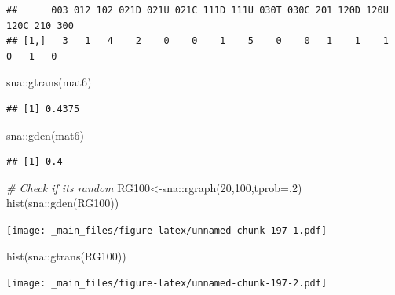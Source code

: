 \documentclass[
  notitlepage,
  onecolumn,
  openany]{book}
\newenvironment{Shaded}{\begin{snugshade}}{\end{snugshade}}
\newcommand{\AttributeTok}[1]{\textcolor[rgb]{0.77,0.63,0.00}{#1}}
\newcommand{\CommentTok}[1]{\textcolor[rgb]{0.56,0.35,0.01}{\textit{#1}}}
\newcommand{\DecValTok}[1]{\textcolor[rgb]{0.00,0.00,0.81}{#1}}
\newcommand{\FunctionTok}[1]{\textcolor[rgb]{0.00,0.00,0.00}{#1}}
\newcommand{\NormalTok}[1]{#1}
\newcommand{\OtherTok}[1]{\textcolor[rgb]{0.56,0.35,0.01}{#1}}
\newcommand{\SpecialCharTok}[1]{\textcolor[rgb]{0.00,0.00,0.00}{#1}}
\begin{document}
\begin{verbatim}
##      003 012 102 021D 021U 021C 111D 111U 030T 030C 201 120D 120U 120C 210 300
## [1,]   3   1   4    2    0    0    1    5    0    0   1    1    1    0   1   0
\end{verbatim}

\begin{Shaded}
\begin{Highlighting}[]
\NormalTok{sna}\SpecialCharTok{::}\FunctionTok{gtrans}\NormalTok{(mat6)}
\end{Highlighting}
\end{Shaded}

\begin{verbatim}
## [1] 0.4375
\end{verbatim}

\begin{Shaded}
\begin{Highlighting}[]
\NormalTok{sna}\SpecialCharTok{::}\FunctionTok{gden}\NormalTok{(mat6)}
\end{Highlighting}
\end{Shaded}

\begin{verbatim}
## [1] 0.4
\end{verbatim}

\begin{Shaded}
\begin{Highlighting}[]
\CommentTok{\# Check if it\textquotesingle{}s random}
\NormalTok{RG100}\OtherTok{\textless{}{-}}\NormalTok{sna}\SpecialCharTok{::}\FunctionTok{rgraph}\NormalTok{(}\DecValTok{20}\NormalTok{,}\DecValTok{100}\NormalTok{,}\AttributeTok{tprob=}\NormalTok{.}\DecValTok{2}\NormalTok{)}
\FunctionTok{hist}\NormalTok{(sna}\SpecialCharTok{::}\FunctionTok{gden}\NormalTok{(RG100))}
\end{Highlighting}
\end{Shaded}

\texttt{[image: \_main\_files/figure-latex/unnamed-chunk-197-1.pdf]}

\begin{Shaded}
\begin{Highlighting}[]
\FunctionTok{hist}\NormalTok{(sna}\SpecialCharTok{::}\FunctionTok{gtrans}\NormalTok{(RG100))}
\end{Highlighting}
\end{Shaded}

\texttt{[image: \_main\_files/figure-latex/unnamed-chunk-197-2.pdf]}
\end{document}
